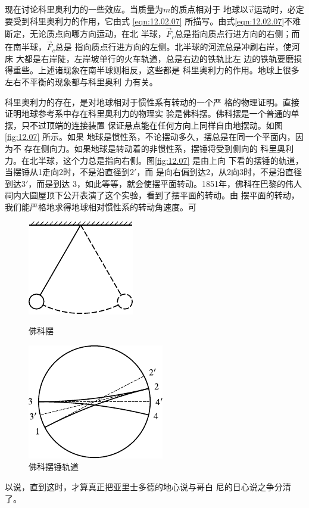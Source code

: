 现在讨论科里奥利力的一些效应。当质量为$ m $的质点相对于
地球以$\vec{v}$运动时，必定要受到科里奥利力的作用，它由式 \eqref{eqn:12.02.07}
所描写。由式\eqref{eqn:12.02.07}不难断定，无论质点向哪方向运动，在北
半球，$ \vec{F}_c $总是指向质点行进方向的右侧；而在南半球，$ \vec{F}_c $总是
指向质点行进方向的左侧。北半球的河流总是冲刷右岸，使河床
大都是右岸陡，左岸坡单行的火车轨道，总是右边的铁轨比左
边的铁轨要磨损得重些。上述诸现象在南半球则相反，这些都是
科里奥利力的作用。地球上很多左右不平衡的现象都与科里奥利
力有关。

科里奥利力的存在，是对地球相对于惯性系有转动的一个严
格的物理证明。直接证明地球参考系中存在科里奥利力的物理实
验是佛科摆。佛科摆是一个普通的单摆，只不过顶端的连接装置
保证悬点能在任何方向上同样自由地摆动。如图\ref{fig:12.07} 所示。如果
地球是惯性系，不论摆动多久，摆总是在同一个平面内，因为不
存在侧向力。如果地球是转动着的非惯性系，摆锤将受到侧向的
科里奥利力。在北半球，这个力总是指向右侧。图\ref{fig:12.07} 是由上向
下看的摆锤的轨道，当摆锤从1走向2时，不是沿直径到$ 2' $，而
是向右偏到达2，从2向3时，不是沿直径到达$ 3' $，而是到达
3，如此等等，就会使摆平面转动。1851年，佛科在巴黎的伟人
祠内大圆屋顶下公开表演了这个实验，看到了摆平面的转动。由
摆平面的转动，我们能严格地求得地球相对惯性系的转动角速度。可

\begin{figure}[h]
  \begin{minipage}[b]{0.5\linewidth}
    \centering
    \includegraphics{figure/fig12.07}
    \caption{佛科摆}
    \label{fig:12.07}
  \end{minipage}
  \begin{minipage}[b]{0.5\linewidth}
    \centering
    \includegraphics{figure/fig12.08}
    \caption{佛科摆锤轨道}
    \label{fig:12.08}
  \end{minipage}
\end{figure}%
\noindent
以说，直到这时，才算真正把亚里士多德的地心说与哥白
尼的日心说之争分清了。

